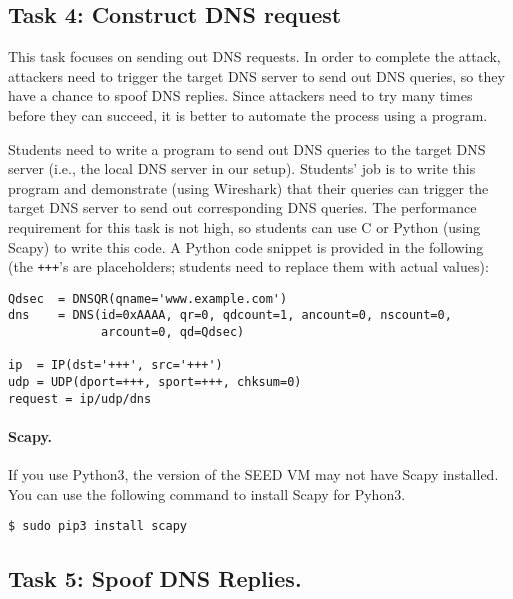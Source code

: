 \subsection{Task 4: Construct DNS request} 

This task focuses on sending out DNS requests. 
In order to complete the attack, attackers need to trigger the target 
DNS server to send out DNS queries, so they have a chance 
to spoof DNS replies. Since attackers need to try many times before they 
can succeed, it is better to automate the process using a program. 

Students need to write a program to send out DNS queries to the target DNS 
server (i.e., the local DNS server in our setup). 
Students' job is to write this program
and demonstrate (using Wireshark) that their queries can
trigger the target DNS server to send out corresponding DNS queries.
The performance requirement for this task is not high, so
students can use C or Python (using Scapy) to write this code. 
A Python code snippet is provided in the following (the 
\texttt{+++}'s are placeholders; students need to replace them
with actual values): 

\begin{lstlisting}
Qdsec  = DNSQR(qname='www.example.com')
dns    = DNS(id=0xAAAA, qr=0, qdcount=1, ancount=0, nscount=0,
             arcount=0, qd=Qdsec)

ip  = IP(dst='+++', src='+++')
udp = UDP(dport=+++, sport=+++, chksum=0)
request = ip/udp/dns
\end{lstlisting}
 

\paragraph{Scapy.} If you use Python3, the version of the SEED VM 
may not have Scapy installed. You can use the following command to 
install Scapy for Pyhon3. 


\begin{lstlisting}
$ sudo pip3 install scapy
\end{lstlisting}
 

\subsection{Task 5: Spoof DNS Replies.}   

